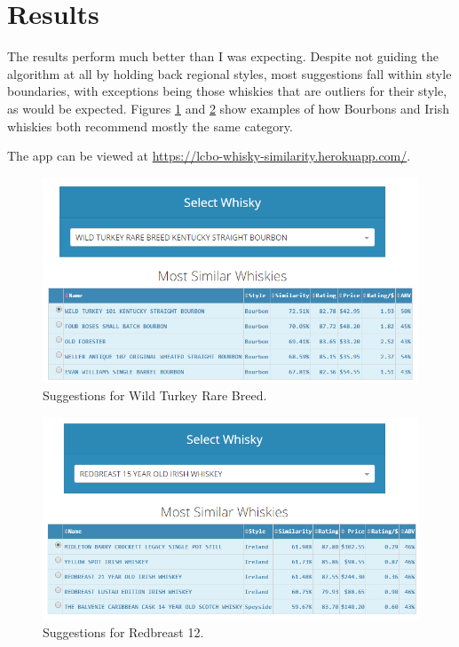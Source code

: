 \documentclass{article}
\begin{document}
\newpage
\section{Results}

The results perform much better than I was expecting. Despite not guiding the algorithm at all by holding back regional styles, most suggestions fall within style boundaries, with exceptions being those whiskies that are outliers for their style, as would be expected. Figures \ref{fig:bourbon} and \ref{fig:irish} show examples of how Bourbons and Irish whiskies both recommend mostly the same category.

The app can be viewed at \href{https://lcbo-whisky-similarity.herokuapp.com/}{https://lcbo-whisky-similarity.herokuapp.com/}.

\begin{figure}[h]
\includegraphics[width=\textwidth]{bourbon}
\centering
\caption{Suggestions for Wild Turkey Rare Breed.}
\label{fig:bourbon}
\end{figure}  

\begin{figure}[h]
\includegraphics[width=\textwidth]{irish}
\centering
\caption{Suggestions for Redbreast 12.}
\label{fig:irish}
\end{figure}  
\end{document}
